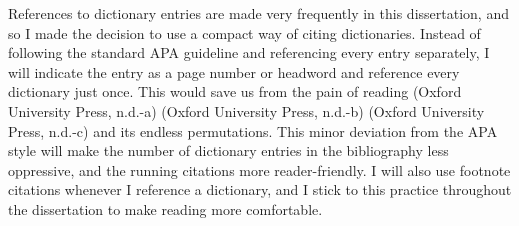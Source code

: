 





\begin{note}
    References to dictionary entries are made very frequently in this dissertation, and so I made the decision to use a compact way of citing dictionaries. Instead of following the standard APA  guideline and referencing every entry separately, I will indicate the entry as a page number or headword and reference every dictionary just once. This would save us from the pain of reading (Oxford University Press, n.d.-a) (Oxford University Press, n.d.-b) (Oxford University Press, n.d.-c) and its endless permutations. This minor deviation from the APA style will make the number of dictionary entries in the bibliography less oppressive, and the running citations more reader-friendly. I will also use footnote citations whenever I reference a dictionary, and I stick to this practice throughout the dissertation to make reading more comfortable.
\end{note}


